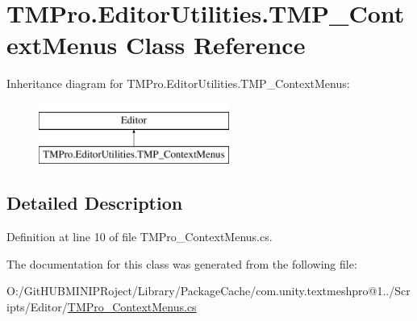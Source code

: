 \hypertarget{class_t_m_pro_1_1_editor_utilities_1_1_t_m_p___context_menus}{}\section{T\+M\+Pro.\+Editor\+Utilities.\+T\+M\+P\+\_\+\+Context\+Menus Class Reference}
\label{class_t_m_pro_1_1_editor_utilities_1_1_t_m_p___context_menus}
Inheritance diagram for T\+M\+Pro.\+Editor\+Utilities.\+T\+M\+P\+\_\+\+Context\+Menus\+:\begin{figure}[H]
\begin{center}
\leavevmode
\includegraphics[height=2.000000cm]{class_t_m_pro_1_1_editor_utilities_1_1_t_m_p___context_menus}
\end{center}
\end{figure}


\subsection{Detailed Description}


Definition at line 10 of file T\+M\+Pro\+\_\+\+Context\+Menus.\+cs.



The documentation for this class was generated from the following file\+:\begin{DoxyCompactItemize}
\item 
O\+:/\+Git\+H\+U\+B\+M\+I\+N\+I\+P\+Roject/\+Library/\+Package\+Cache/com.\+unity.\+textmeshpro@1../\+Scripts/\+Editor/\mbox{\hyperlink{_t_m_pro___context_menus_8cs}{T\+M\+Pro\+\_\+\+Context\+Menus.\+cs}}\end{DoxyCompactItemize}
